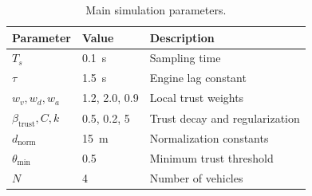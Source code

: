 \documentclass{ifacconf}
\begin{document}

\begin{table}[h!]
\centering
\caption{Main simulation parameters.}
\label{tab:sim_params}
\begin{tabular}{lll}
\toprule
\textbf{Parameter} & \textbf{Value} & \textbf{Description} \\
\midrule
$T_s$ & 0.1~s & Sampling time \\
$\tau$ & 1.5~s & Engine lag constant \\
$w_v, w_d, w_a$ & 1.2, 2.0, 0.9 & Local trust weights \\
$\beta_{\text{trust}}, C, k$ & 0.5, 0.2, 5 & Trust decay and regularization \\
$d_{\text{norm}}$ & 15~m & Normalization constants \\
$\theta_{\min}$ & 0.5 & Minimum trust threshold \\
$N$ & 4 & Number of vehicles \\
\bottomrule
\end{tabular}
\end{table}

\end{document}
